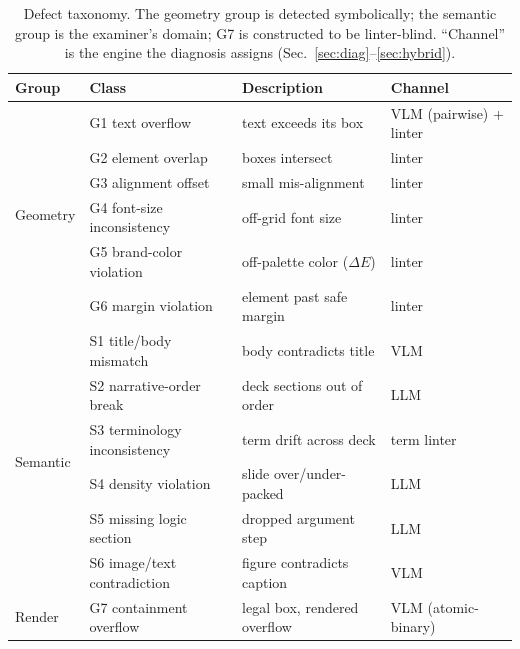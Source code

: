 \documentclass[10pt]{article}
\newcommand{\g}[1]{\textsf{#1}}        %
\begin{document}
\begin{table}[t]
\centering
\small
\caption{Defect taxonomy. The geometry group is detected symbolically; the semantic group is the examiner's
domain; \g{G7} is constructed to be linter-blind. ``Channel'' is the engine the diagnosis assigns
(Sec.~\ref{sec:diag}--\ref{sec:hybrid}).}
\label{tab:taxonomy}
\begin{tabular}{@{}llll@{}}
\toprule
Group & Class & Description & Channel \\
\midrule
\multirow{6}{*}{Geometry} & \g{G1} text overflow & text exceeds its box & VLM (pairwise) + linter \\
 & \g{G2} element overlap & boxes intersect & linter \\
 & \g{G3} alignment offset & small mis-alignment & linter \\
 & \g{G4} font-size inconsistency & off-grid font size & linter \\
 & \g{G5} brand-color violation & off-palette color ($\Delta E$) & linter \\
 & \g{G6} margin violation & element past safe margin & linter \\
\midrule
\multirow{6}{*}{Semantic} & \g{S1} title/body mismatch & body contradicts title & VLM \\
 & \g{S2} narrative-order break & deck sections out of order & LLM \\
 & \g{S3} terminology inconsistency & term drift across deck & term linter \\
 & \g{S4} density violation & slide over/under-packed & LLM \\
 & \g{S5} missing logic section & dropped argument step & LLM \\
 & \g{S6} image/text contradiction & figure contradicts caption & VLM \\
\midrule
Render & \g{G7} containment overflow & legal box, rendered overflow & VLM (atomic-binary) \\
\bottomrule
\end{tabular}
\end{table}
\end{document}
